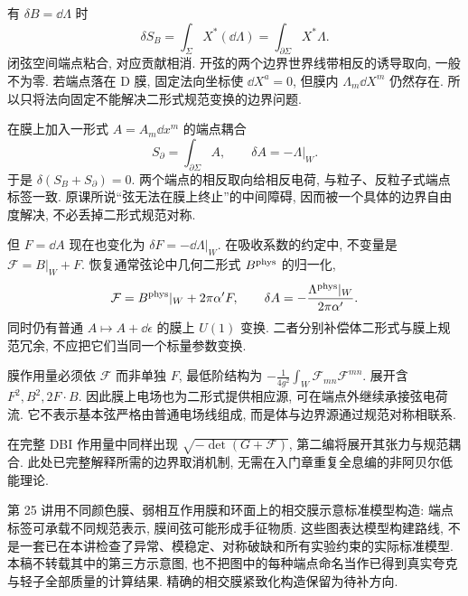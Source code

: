 有 $\delta B=\dd\Lambda$ 时
\[
 \delta S_B=\int_\Sigma X^*(\dd\Lambda)
 =\int_{\partial\Sigma}X^*\Lambda.
\]
闭弦空间端点粘合, 对应贡献相消. 开弦的两个边界世界线带相反的诱导取向, 一般不为零. 若端点落在 D 膜, 固定法向坐标使 $\dd X^a=0$, 但膜内 $\Lambda_m\dd X^m$ 仍然存在. 所以只将法向固定不能解决二形式规范变换的边界问题.

在膜上加入一形式 $A=A_m\dd x^m$ 的端点耦合
\[
 S_{\partial}=\int_{\partial\Sigma}A,
 \qquad\delta A=-\Lambda|_W.
\]
于是 $\delta(S_B+S_{\partial})=0$. 两个端点的相反取向给相反电荷, 与粒子、反粒子式端点标签一致. 原课所说“弦无法在膜上终止”的中间障碍, 因而被一个具体的边界自由度解决, 不必丢掉二形式规范对称.

但 $F=\dd A$ 现在也变化为 $\delta F=-\dd\Lambda|_W$. 在吸收系数的约定中, 不变量是 $\mathcal F=B|_W+F$. 恢复通常弦论中几何二形式 $B^{\rm phys}$ 的归一化,
\[
 \mathcal F=B^{\rm phys}|_W+2\pi\alpha'F,
 \qquad\delta A=-\frac{\Lambda^{\rm phys}|_W}{2\pi\alpha'}.
\]
同时仍有普通 $A\mapsto A+\dd\epsilon$ 的膜上 $U(1)$ 变换. 二者分别补偿体二形式与膜上规范冗余, 不应把它们当同一个标量参数变换.

膜作用量必须依 $\mathcal F$ 而非单独 $F$, 最低阶结构为 $-\frac1{4g^2}\int_W\mathcal F_{mn}\mathcal F^{mn}$. 展开含 $F^2,B^2,2F\cdot B$. 因此膜上电场也为二形式提供相应源, 可在端点外继续承接弦电荷流. 它不表示基本弦严格由普通电场线组成, 而是体与边界源通过规范对称相联系.

在完整 DBI 作用量中同样出现 $\sqrt{-\det(G+\mathcal F)}$, 第二编将展开其张力与规范耦合. 此处已完整解释所需的边界取消机制, 无需在入门章重复全息编的非阿贝尔低能理论.

第 25 讲用不同颜色膜、弱相互作用膜和环面上的相交膜示意标准模型构造: 端点标签可承载不同规范表示, 膜间弦可能形成手征物质. 这些图表达模型构建路线, 不是一套已在本讲检查了异常、模稳定、对称破缺和所有实验约束的实际标准模型. 本稿不转载其中的第三方示意图, 也不把图中的每种端点命名当作已得到真实夸克与轻子全部质量的计算结果. 精确的相交膜紧致化构造保留为待补方向.
